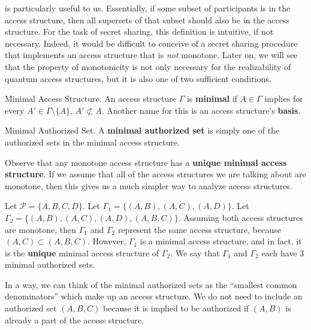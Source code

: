  is particularly useful to us. Essentially, if some subset of participants is in the access structure, then all supersets of that subset should also be in the access structure. For the task of secret sharing, this definition is intuitive, if not necessary. Indeed, it would be difficult to conceive of a secret sharing procedure that implements an access structure that is \textit{not} monotone. Later on, we will see that the property of monotonicity is not only necessary for the realizability of quantum access structures, but it is also one of two sufficient conditions.

\begin{definition}{Minimal Access Structure.}
    \label{defn:minimal-as}
    An access structure $\Gamma$ is \textbf{minimal} if $A \in \Gamma$ implies for every $A' \in \Gamma \setminus \{A\}$, $A' \not\subset A$. Another name for this is an access structure's \textbf{basis}.
\end{definition}

\begin{definition}{Minimal Authorized Set.}
    \label{defn:minimal-authorized-set}
    A \textbf{minimal authorized set} is simply one of the authorized sets in the minimal access structure.
\end{definition}

Observe that any monotone access structure has a \textbf{unique minimal access structure}. If we assume that all of the access structures we are talking about are monotone, then this gives us a much simpler way to analyze access structures.

\begin{example}
    Let $\mathcal{P} = \{A,B,C,D\}$. Let $\Gamma_1 = \{(A,B), (A,C), (A,D)\}$. Let $\Gamma_2 = \{(A,B), (A,C), (A,D), (A,B,C)\}$. Assuming both access structures are monotone, then $\Gamma_1$ and $\Gamma_2$ represent the same access structure, because $(A,C) \subset (A,B,C)$. However, $\Gamma_1$ is a minimal access structure, and in fact, it is the \textbf{unique} minimal access structure of $\Gamma_2$. We say that $\Gamma_1$ and $\Gamma_2$ each have 3 minimal authorized sets.
\end{example}

In a way, we can think of the minimal authorized sets as the ``smallest common denominators'' which make up an access structure. We do not need to include an authorized set $(A,B,C)$ because it is implied to be authorized if $(A,B)$ is already a part of the access structure.


